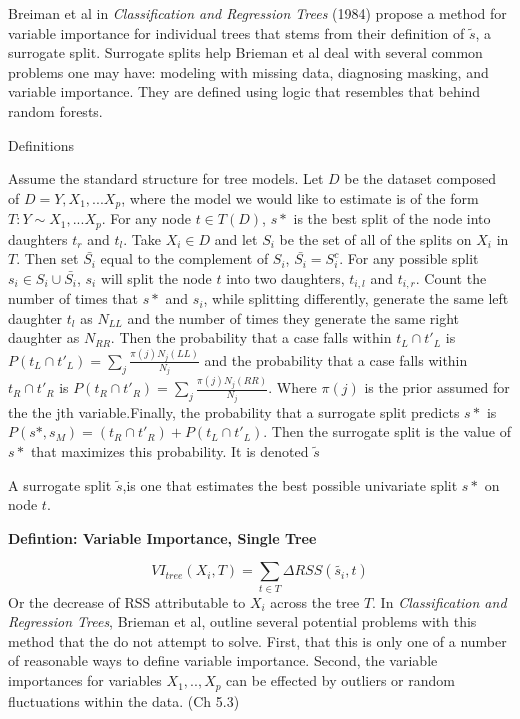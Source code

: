 \documentclass[12pt,twoside]{reedthesis}
\begin{document}
  Breiman et al in \emph{Classification and Regression Trees} (1984)
  propose a method for variable importance for individual trees that stems
  from their definition of \(\tilde{s}\), a surrogate split. Surrogate
  splits help Brieman et al deal with several common problems one may
  have: modeling with missing data, diagnosing masking, and variable
  importance. They are defined using logic that resembles that behind
  random forests.
  
  Definitions
  
  Assume the standard structure for tree models. Let \(D\) be the dataset
  composed of \(D = {Y, X_1,...X_p}\), where the model we would like to
  estimate is of the form \(T: Y \sim X_1,...X_p\). For any node
  \(t \in T(D)\), \(s*\) is the best split of the node into daughters
  \(t_r\) and \(t_l\). Take \(X_i \in D\) and let \(S_i\) be the set of
  all of the splits on \(X_i\) in \(T\). Then set \(\bar{S_i}\) equal to
  the complement of \(S_i\), \(\bar{S_i} = S_i^c\). For any possible split
  \(s_i \in S_i \cup \bar{S_i}\), \(s_i\) will split the node \(t\) into
  two daughters, \(t_{i,l}\) and \(t_{i,r}\). Count the number of times
  that \(s*\) and \(s_i\), while splitting differently, generate the same
  left daughter \(t_{l}\) as \(N_{LL}\) and the number of times they
  generate the same right daughter as \(N_{RR}\). Then the probability
  that a case falls within \(t_L \cap t'_L\) is
  \(P(t_L \cap t'_L) = \sum_j \frac{\pi(j) N_j(LL)}{N_j}\) and the
  probability that a case falls within \(t_R \cap t'_R\) is
  \(P(t_R \cap t'_R) = \sum_j \frac{\pi(j) N_j(RR)}{N_j}\). Where
  \(\pi(j)\) is the prior assumed for the the jth variable.Finally, the
  probability that a surrogate split predicts \(s*\) is
  \(P(s*, s_M) = (t_R \cap t'_R) + P(t_L \cap t'_L)\). Then the surrogate
  split is the value of \(s*\) that maximizes this probability. It is
  denoted \(\tilde{s}\)
  
  A surrogate split \(\tilde{s}\),is one that estimates the best possible
  univariate split \(s*\) on node \(t\).
  
  \textbf{Defintion: Variable Importance, Single Tree}
  
  \[VI_{tree}(X_i, T) = \sum_{t \in T} \Delta RSS(\tilde{s_i}, t)\] Or the
  decrease of RSS attributable to \(X_i\) across the tree \(T\). In
  \emph{Classification and Regression Trees}, Brieman et al, outline
  several potential problems with this method that the do not attempt to
  solve. First, that this is only one of a number of reasonable ways to
  define variable importance. Second, the variable importances for
  variables \(X_1,..,X_p\) can be effected by outliers or random
  fluctuations within the data. (Ch 5.3)
  
\end{document}
